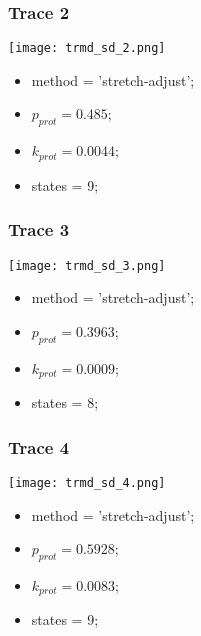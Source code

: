 \subsubsection{Trace 2}
\begin{minipage}[c]{0.7\textwidth}
    \texttt{[image: trmd\_sd\_2.png]}
\end{minipage}
\hfill
\begin{minipage}[c]{0.45\textwidth}
    \begin{itemize}
        \item method = 'stretch-adjust';
        \item $p_{prot}=0.485$;
        \item $k_{prot}=0.0044$;
        \item states = 9;
    \end{itemize}
\end{minipage}

\subsubsection{Trace 3}
\begin{minipage}[c]{0.7\textwidth}
    \texttt{[image: trmd\_sd\_3.png]}
\end{minipage}
\hfill
\begin{minipage}[c]{0.45\textwidth}
    \begin{itemize}
        \item method = 'stretch-adjust';
        \item $p_{prot}=0.3963$;
        \item $k_{prot}=0.0009$;
        \item states = 8;
    \end{itemize}
\end{minipage}

\subsubsection{Trace 4}
\begin{minipage}[c]{0.7\textwidth}
    \texttt{[image: trmd\_sd\_4.png]}
\end{minipage}
\hfill
\begin{minipage}[c]{0.45\textwidth}
    \begin{itemize}
        \item method = 'stretch-adjust';
        \item $p_{prot}=0.5928$;
        \item $k_{prot}=0.0083$;
        \item states = 9;
    \end{itemize}
\end{minipage}

